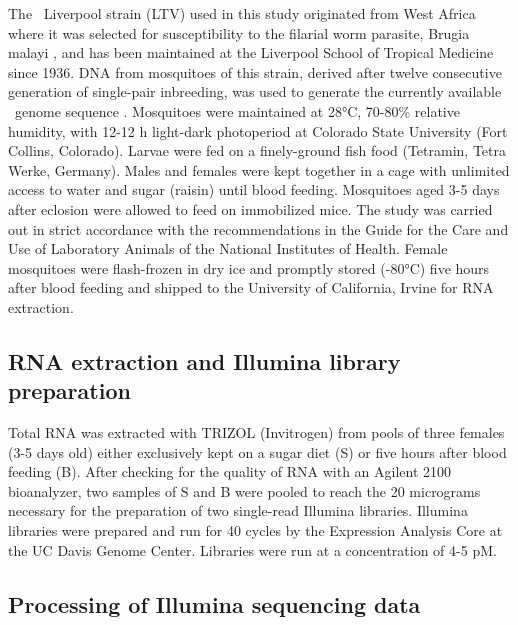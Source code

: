 The \Aa\ Liverpool strain (LTV) used in this study originated from West Africa where it was selected for susceptibility to the filarial worm parasite, Brugia malayi \cite{MACDONALD1963}, and has been maintained at the Liverpool School of Tropical Medicine since 1936. DNA from mosquitoes of this strain, derived after twelve consecutive generation of single-pair inbreeding, was used to generate the currently available \Aa\ genome sequence \cite{Nene2007}. Mosquitoes were maintained at 28°C, 70-80\% relative humidity, with 12-12 h light-dark photoperiod at Colorado State University (Fort Collins, Colorado). Larvae were fed on a finely-ground fish food (Tetramin, Tetra Werke, Germany). Males and females were kept together in a cage with unlimited access to water and sugar (raisin) until blood feeding. Mosquitoes aged 3-5 days after eclosion were allowed to feed on immobilized mice. The study was carried out in strict accordance with the recommendations in the Guide for the Care and Use of Laboratory Animals of the National Institutes of Health. Female mosquitoes were flash-frozen in dry ice and promptly stored (-80°C) five hours after blood feeding and shipped to the University of California, Irvine for RNA extraction.

\subsection{RNA extraction and Illumina library preparation}

Total RNA was extracted with TRIZOL (Invitrogen) from pools of three females (3-5 days old) either exclusively kept on a sugar diet (S) or five hours after blood feeding (B). After checking for the quality of RNA with an Agilent 2100 bioanalyzer, two samples of S and B were pooled to reach the 20 micrograms necessary for the preparation of two single-read Illumina libraries. Illumina libraries were prepared and run for 40 cycles by the Expression Analysis Core at the UC Davis Genome Center. Libraries were run at a concentration of 4-5 pM.

\subsection{Processing of Illumina sequencing data}

